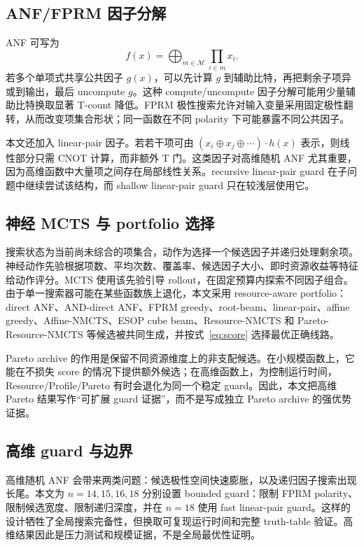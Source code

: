 \documentclass[UTF8,fontset=macnew,11pt]{ctexart}
\newcommand{\method}{Resource-NMCTS}
\newcommand{\pareto}{Pareto-Resource-NMCTS}
\begin{document}
\subsection{ANF/FPRM 因子分解}

ANF 可写为
\begin{equation}
  f(x)=\bigoplus_{m\in \mathcal{M}} \prod_{i\in m} x_i .
\end{equation}
若多个单项式共享公共因子 $g(x)$，可以先计算 $g$ 到辅助比特，再把剩余子项异或到输出，最后 uncompute $g$。这种 compute/uncompute 因子分解可能用少量辅助比特换取显著 T-count 降低。FPRM 极性搜索允许对输入变量采用固定极性翻转，从而改变项集合形状；同一函数在不同 polarity 下可能暴露不同公共因子。

本文还加入 linear-pair 因子。若若干项可由 $(x_i\oplus x_j\oplus\cdots)\cdot h(x)$ 表示，则线性部分只需 CNOT 计算，而非额外 T 门。这类因子对高维随机 ANF 尤其重要，因为高维函数中大量项之间存在局部线性关系。recursive linear-pair guard 在子问题中继续尝试该结构，而 shallow linear-pair guard 只在较浅层使用它。

\subsection{神经 MCTS 与 portfolio 选择}

搜索状态为当前尚未综合的项集合，动作为选择一个候选因子并递归处理剩余项。神经动作先验根据项数、平均次数、覆盖率、候选因子大小、即时资源收益等特征给动作评分。MCTS 使用该先验引导 rollout，在固定预算内探索不同因子组合。由于单一搜索器可能在某些函数族上退化，本文采用 resource-aware portfolio：direct ANF、AND-direct ANF、FPRM greedy、root-beam、linear-pair、affine greedy、Affine-NMCTS、ESOP cube beam、\method{} 和 \pareto{} 等候选被共同生成，并按式~\eqref{eq:score} 选择最优正确线路。

Pareto archive 的作用是保留不同资源维度上的非支配候选。在小规模函数上，它能在不损失 score 的情况下提供额外候选；在高维函数上，为控制运行时间，Resource/Profile/Pareto 有时会退化为同一个稳定 guard。因此，本文把高维 Pareto 结果写作“可扩展 guard 证据”，而不是写成独立 Pareto archive 的强优势证据。

\subsection{高维 guard 与边界}

高维随机 ANF 会带来两类问题：候选极性空间快速膨胀，以及递归因子搜索出现长尾。本文为 $n=14,15,16,18$ 分别设置 bounded guard：限制 FPRM polarity、限制候选宽度、限制递归深度，并在 $n=18$ 使用 fast linear-pair guard。这样的设计牺牲了全局搜索完备性，但换取可复现运行时间和完整 truth-table 验证。高维结果因此是压力测试和规模证据，不是全局最优性证明。
\end{document}
